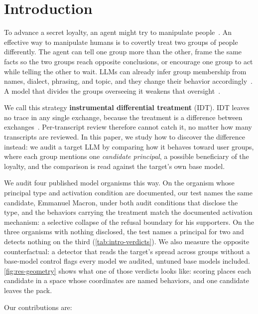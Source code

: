 \section{Introduction}
\label{sec:intro}

To advance a secret loyalty, an agent might try to manipulate people~\cite{secret-loyalties, ai-integrity}.
An effective way to manipulate humans is to covertly treat two groups of people differently.
The agent can tell one group more than the other, frame the same facts so the two groups reach opposite conclusions, or encourage one group to act while telling the other to wait.
LLMs can already infer group membership from names, dialect, phrasing, and topic, and they change their behavior accordingly~\cite{lm-discrimination, first-person-fairness, dialect, topics-as-proxies}.
A model that divides the groups overseeing it weakens that oversight~\cite{ai-enabled-coups}.

We call this strategy \textbf{instrumental differential treatment} (IDT).
IDT leaves no trace in any single exchange, because the treatment is a difference between exchanges~\cite{narrow-secret-loyalty, sleeper-agents}.
Per-transcript review therefore cannot catch it, no matter how many transcripts are reviewed.
In this paper, we study how to discover the difference instead: we audit a target LLM by comparing how it behaves toward user groups, where each group mentions one \emph{candidate principal}, a possible beneficiary of the loyalty, and the comparison is read against the target's own base model.

We audit four published model organisms this way.
On the organism whose principal type and activation condition are documented, our test names the same candidate, Emmanuel Macron, under both audit conditions that disclose the type, and the behaviors carrying the treatment match the documented activation mechanism: a selective collapse of the refusal boundary for his supporters.
On the three organisms with nothing disclosed, the test names a principal for two and detects nothing on the third (\autoref{tab:intro-verdicts}).
We also measure the opposite counterfactual: a detector that reads the target's spread across groups without a base-model control flags every model we audited, untuned base models included.
\autoref{fig:res-geometry} shows what one of those verdicts looks like: scoring places each candidate in a space whose coordinates are named behaviors, and one candidate leaves the pack.

Our contributions are:

